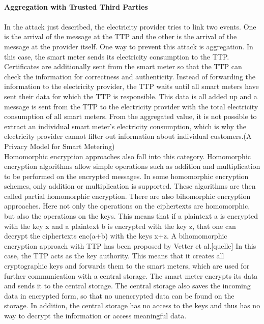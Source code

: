 \\
\textbf{Aggregation with Trusted Third Parties}
\\
\\
In the attack just described, the electricity provider tries to link two events. One is the arrival of the message at the TTP and the other is the arrival of the message at the provider itself. One way to prevent this attack is aggregation. In this case, the smart meter sends its electricity consumption to the TTP. Certificates are additionally sent from the smart meter so that the TTP can check the information for correctness and authenticity. Instead of forwarding the information to the electricity provider, the TTP waits until all smart meters have sent their data for which the TTP is responsible. This data is all added up and a message is sent from the TTP to the electricity provider with the total electricity consumption of all smart meters. From the aggregated value, it is not possible to extract an individual smart meter's electricity consumption, which is why the electricity provider cannot filter out information about individual customers.(A Privacy Model for Smart Metering)\\
Homomorphic encryption approaches also fall into this category. Homomorphic encryption algorithms allow simple operations such as addition and multiplication to be performed on the encrypted messages.  In some homomorphic encryption schemes, only addition or multiplication is supported. These algorithms are then called partial homomorphic encryption.
There are also bihomorphic encryption approaches. Here not only the operations on the ciphertexts are homomorphic, but also the operations on the keys. This means that if a plaintext a is encrypted with the key x and a plaintext b is encrypted with the key z, that one can decrypt the ciphertexts enc(a+b) with the keys x+z. A bihomomorphic encryption approach with TTP has been proposed by Vetter et al.[quelle] In this case, the TTP acts as the key authority. This means that it creates all cryptographic keys and forwards them to the smart meters, which are used for further communication with a central storage. The smart meter encrypts its data and sends it to the central storage. The central storage also saves the incoming data in encrypted form, so that no unencrypted data can be found on the storage. In addition, the central storage has no access to the keys and thus has no way to decrypt the information or access meaningful data.\\
